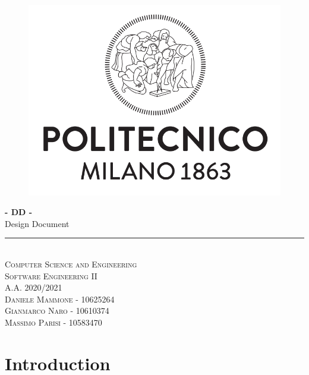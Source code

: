 \documentclass{article}
\begin{document}
\begin{titlepage}
	\begin{center}
		\begin{figure}
			\centering
			\includegraphics[scale=0.3]{LogoPolimi.PNG} \\
			[0.3cm]
		\end{figure}
		\Huge{\bfseries - DD -} \\
		[0.5cm]
		\huge{Design Document} \\
		[1mm]
		\rule{300pt}{3pt} \\
		[1.0cm]
		\textsc{\Large Computer Science and Engineering} \\ 
		\textsc{\Huge Software Engineering II} \\
		\textsc{\Large A.A. 2020/2021} \\
		[1cm]
		\textsc{\LARGE Daniele Mammone - 10625264} \\
		\textsc{\LARGE Gianmarco Naro - 10610374} \\
		\textsc{\LARGE Massimo Parisi - 10583470} \\
	\end{center}
\end{titlepage}

\newpage

\renewcommand\contentsname{Contents}
\tableofcontents

\newpage

\section{Introduction}
\end{document}
